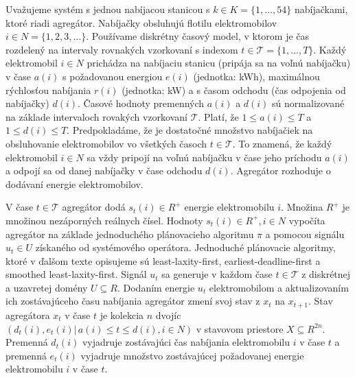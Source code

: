 Uvažujeme systém s jednou nabíjacou stanicou s $k \in K = \{1, \dots, 54\}$ nabíjačkami, ktoré riadi agregátor. Nabíjačky obsluhujú flotilu elektromobilov $i \in N= \{1,2,3,\dots \}$.
Používame diskrétny časový model, v ktorom je čas rozdelený na intervaly rovnakých vzorkovaní s indexom $t \in \mathcal{T} = \{1,\dots,T\}$. Každý elektromobil $i \in N$ prichádza na nabíjaciu stanicu (pripája sa na voľnú nabíjačku) v čase $a(i)$ s požadovanou energiou $e(i)$ (jednotka: kWh), maximálnou rýchlosťou nabíjania $r(i)$ (jednotka: kW) a s časom odchodu (čas odpojenia od nabíjačky) $d(i)$. Časové hodnoty premenných $a(i)$ a $d(i)$ sú normalizované na základe intervaloch rovakých vzorkovaní $\mathcal{T}$. Platí, že $1 \leq a(i) \leq T$ a  $1 \leq d(i) \leq T$. Predpokladáme, že je dostatočné množstvo nabíjačiek na obsluhovanie elektromobilov vo všetkých časoch $t \in \mathcal{T}$. To znamená, že každý elektromobil $i \in N$ sa vždy pripojí na voľnú nabíjačku v čase jeho príchodu $a(i)$ a odpojí sa od danej nabíjačky v čase odchodu $d(i)$. Agregátor rozhoduje o dodávaní energie elektromobilov. 



V čase $t \in \mathcal{T}$ agregátor dodá $s_{t}(i) \in R^{+}$  energie elektromobilu $i$. Množina $R^{+}$ je množinou nezáporných reálnych čísel. Hodnoty $s_{t}(i) \in R^{+}, i \in N$ vypočíta agregátor na základe jednoduchého plánovacieho algoritmu $\pi$ a pomocou signálu $u_{t} \in U$  získaného od systémového operátora. Jednoduché plánovacie algoritmy, ktoré v ďalšom texte opisujeme sú least-laxity-first, earliest-deadline-first a smoothed least-laxity-first. Signál $u_{t}$ sa generuje v každom čase $t \in \mathcal{T}$ z diskrétnej a uzavretej domény $U \subseteq R$. Dodaním energie $u_{t}$ elektromobilom a aktualizovaním ich zostávajúceho času nabíjania agregátor zmení svoj stav z $x_{t}$ na $x_{t + 1}$. Stav agregátora $x_{t}$ v čase $t$ je kolekcia $n$ dvojíc $(d_{t}(i), e_{t}(i)| \, a(i) \leq t \leq d(i), i \in N)$ v stavovom priestore $X \subseteq R^{2n}$. Premenná $d_{t}(i)$ vyjadruje zostávajúci čas nabíjania elektromobilu $i$ v čase $t$ a premenná $e_{t}(i)$ vyjadruje množstvo zostávajúcej požadovanej energie elektromobilu $i$ v čase $t$. 


